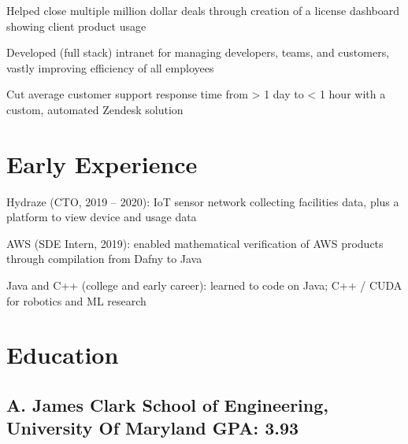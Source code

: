 \documentclass[print]{jack-resume}
\begin{document}
\begin{tightemize}
    \item Helped close multiple million dollar deals through creation of a license dashboard showing client product usage
    \item Developed (full stack) intranet for managing developers, teams, and customers, vastly improving efficiency of all employees
    \item Cut average customer support response time from > 1 day to < 1 hour with a custom, automated Zendesk solution
\end{tightemize}
\sectionsep

\section{Early Experience}
\vspace{1.4em}
\begin{tightemize}
    \item Hydraze (CTO, 2019 -- 2020): IoT sensor network collecting facilities data, plus a platform to view device and usage data
    \item AWS (SDE Intern, 2019): enabled mathematical verification of AWS products through compilation from Dafny to Java
    \item Java and C++ (college and early career): learned to code on Java; C++ / CUDA for robotics and ML research
\end{tightemize}
\sectionsep

\section{Education}
\subsection{A. James Clark School of Engineering, University Of Maryland \hfill GPA: 3.93}

\begin{minipage}[t]{0.04\textwidth}
    \hfill
\end{minipage}
\end{document}
